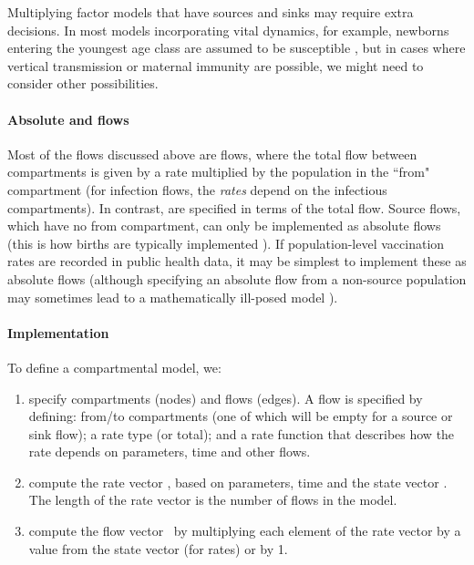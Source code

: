 Multiplying factor models that have sources and sinks may require extra decisions. In most models incorporating vital dynamics, for example, newborns entering the youngest age class are assumed to be susceptible \citep{Earn2008}, but in cases where vertical transmission or maternal immunity are possible, we might need to consider other possibilities. 

\paragraph{Absolute and \pc flows}

Most of the flows discussed above are \pc flows, where the total flow between compartments is given by a \pc rate multiplied by the population in the ``from" compartment
(for infection flows, the \pc \emph{rates} depend on the infectious compartments).
In contrast,  are specified in terms of the total flow. 
Source flows, which have no from compartment, can only be implemented as absolute flows (this is how births are typically implemented \citep{Earn2008}). If population-level vaccination rates are recorded in public health data, it may be simplest to implement these as absolute flows (although specifying an absolute flow from a non-source population may sometimes lead to a mathematically ill-posed model \citep{gharouni2022testing}).

\paragraph{Implementation}

To define a compartmental model, we:

\begin{enumerate}
\item specify compartments (nodes) and flows (edges). A flow is specified by defining: from/to compartments (one of which will be empty for a source or sink flow); a rate type (\pc or total); and a rate function that describes how the rate depends on parameters, time and other flows. 

\item compute the rate vector \ratevector, based on parameters, time and the state vector \statevector. The length of the rate vector is the number of flows in the model.

\item compute the flow vector \flowvector\ by multiplying each element of the rate vector by a value from the state vector (for \pc rates) or by 1.

\end{enumerate}

